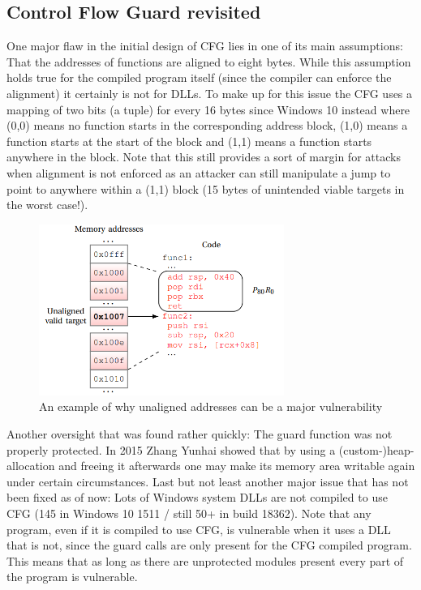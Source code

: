 \documentclass[10pt,twocolumn,a4paper]{article}
\begin{document}
\subsection{Control Flow Guard revisited}
One major flaw in the initial design of CFG lies in one of its main assumptions: That the addresses of functions are aligned to eight bytes.
While this assumption holds true for the compiled program itself (since the compiler can enforce the alignment) it certainly is not for DLLs.
To make up for this issue the CFG uses a mapping of two bits (a tuple) for every 16 bytes since Windows 10 instead where (0,0) means no function starts in the corresponding address block, (1,0) means a function starts at the start of the block and (1,1) means a function starts anywhere in the block.
Note that this still provides a sort of margin for attacks when alignment is not enforced as an attacker can still manipulate a jump to point to anywhere within a (1,1) block (15 bytes of unintended viable targets in the worst case!).
\begin{figure}[h]
	\includegraphics[keepaspectratio,width=8cm]{fig/cfgunallignedcode}
	\caption{An example of why unaligned addresses can be a major vulnerability\cite{cfgexplore}}
\end{figure}\newline
Another oversight that was found rather quickly: The guard function was not properly protected.
In 2015 Zhang Yunhai showed that by using a (custom-)heap-allocation and freeing it afterwards one may make its memory area writable again under certain circumstances.\cite{cfgbypass}
Last but not least another major issue that has not been fixed as of now:
Lots of Windows system DLLs are not compiled to use CFG (145 in Windows 10 1511 / still 50+ in build 18362).\cite{cfgbypass2}
Note that any program, even if it is compiled to use CFG, is vulnerable when it uses a DLL that is not, since the guard calls are only present for the CFG compiled program.
This means that as long as there are unprotected modules present every part of the program is vulnerable.
\end{document}
